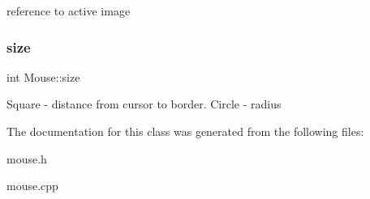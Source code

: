 reference to active image \mbox{\label{class_mouse_ad6bd34e208f4050da3e1fd4e0cfcea62}} 
\subsubsection{\texorpdfstring{size}{size}}
{\footnotesize\ttfamily int Mouse\+::size\hspace{0.3cm}{\ttfamily [protected]}}

Square -\/ distance from cursor to border. Circle -\/ radius 

The documentation for this class was generated from the following files\+:\begin{DoxyCompactItemize}
\item 
mouse.\+h\item 
mouse.\+cpp\end{DoxyCompactItemize}
